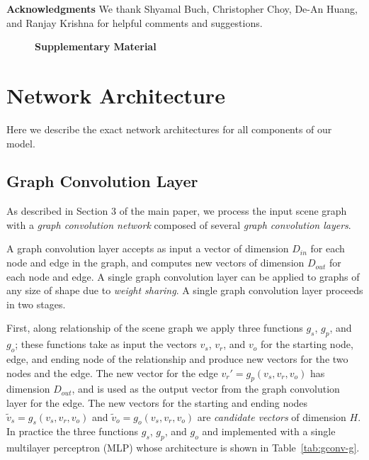 \documentclass[10pt,twocolumn,letterpaper]{article}
\begin{document}
\textbf{Acknowledgments} We thank Shyamal Buch, Christopher Choy, De-An Huang, and Ranjay Krishna for helpful comments and suggestions.

{\small


}

\clearpage
\appendix
\begin{figure}[ht!]
  \centering
  \Large\textbf{Supplementary Material}
\end{figure}
\section{Network Architecture}
Here we describe the exact network architectures for all components of our model.

\subsection{Graph Convolution Layer}
As described in Section 3 of the main paper, we process the input scene graph with a \emph{graph convolution network} composed of several \emph{graph convolution layers}.


A graph convolution layer accepts as input a vector of dimension $D_{in}$ for each node and edge in the graph, and computes new vectors of dimension $D_{out}$ for each node and edge. A single graph convolution layer can be applied to graphs of any size of shape due to \emph{weight sharing}. A single graph convolution layer proceeds in two stages.

First, along relationship of the scene graph we apply three functions $g_s$, $g_p$, and $g_o$; these functions take as input the vectors $v_s$, $v_r$, and $v_o$ for the starting node, edge, and ending node of the relationship and produce new vectors for the two nodes and the edge. The new vector for the edge $v_r'=g_p(v_s, v_r, v_o)$ has dimension $D_{out}$, and is used as the output vector from the graph convolution layer for the edge. The new vectors for the starting and ending nodes $\tilde v_s = g_s(v_s, v_r, v_o)$ and $\tilde v_o = g_o(v_s, v_r, v_o)$ are \emph{candidate vectors} of dimension $H$. In practice the three functions $g_s$, $g_p$, and $g_o$ and implemented with a single multilayer perceptron (MLP) whose architecture is shown in Table~\ref{tab:gconv-g}.
\end{document}
